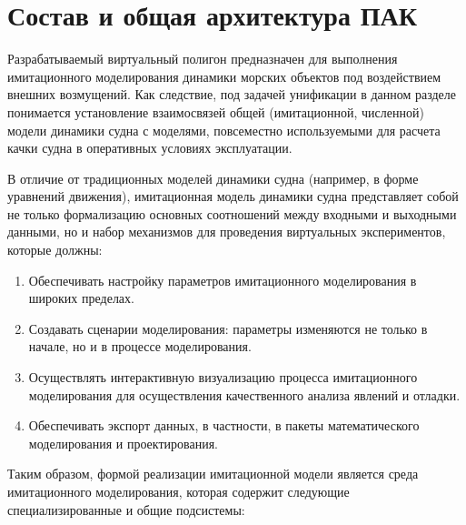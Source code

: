 \section{Состав и общая архитектура ПАК}

Разрабатываемый виртуальный полигон предназначен для выполнения имитационного моделирования 
динамики морских объектов под воздействием внешних возмущений. Как следствие, под задачей 
унификации в данном разделе понимается установление взаимосвязей общей (имитационной, численной) 
модели динамики судна с  моделями, повсеместно используемыми для расчета качки судна 
в оперативных условиях эксплуатации.

В отличие от традиционных моделей динамики судна (например, в форме уравнений движения), 
имитационная модель динамики судна представляет собой не только формализацию основных 
соотношений между входными и выходными данными, но и набор механизмов для проведения 
виртуальных экспериментов, которые должны:

\begin{enumerate}
\item	Обеспечивать настройку параметров имитационного моделирования в широких пределах.
\item	Создавать сценарии моделирования: параметры изменяются не только в начале, но и в процессе моделирования.
\item	Осуществлять интерактивную визуализацию процесса имитационного моделирования для осуществления качественного анализа явлений и отладки.
\item	Обеспечивать экспорт данных, в частности, в пакеты математического моделирования и проектирования.
\end{enumerate}

Таким образом, формой реализации имитационной модели является среда имитационного моделирования, которая содержит следующие специализированные и общие подсистемы:

